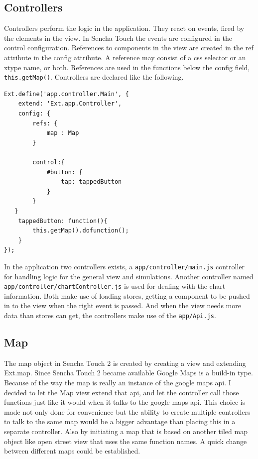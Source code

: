 \subsection{Controllers}
Controllers perform the logic in the application. They react on events, fired by the elements in the view. In Sencha Touch the events are configured in the control configuration. References to components in the view are created in the ref attribute in the config attribute. A reference may consist of a css selector or an xtype name, or both. References are used in the functions below the config field, \texttt{this.getMap()}. Controllers are declared like the following.
\begin{lstlisting}
Ext.define('app.controller.Main', {
	extend: 'Ext.app.Controller',
	config: {
		refs: {  
			map : Map      
		}
		
		control:{
			#button: {
				tap: tappedButton
			}
		}        
   }   
	tappedButton: function(){
		this.getMap().dofunction();
	}
});
\end{lstlisting}
In the application two controllers exists, a \texttt{app/controller/main.js} controller for handling logic for the general view and simulations. Another controller named \\
\texttt{app/controller/chartController.js} is used for dealing with the chart information. Both make use of loading stores, getting a component to be pushed in to the view when the right event is passed. And when the view needs more data than stores can get, the controllers make use of the \texttt{app/Api.js}. 

\subsection{Map}
The map object in Sencha Touch 2 is created by creating a view and extending Ext.map. Since Sencha Touch 2 became available Google Maps is a build-in type. Because of the way the map is really an instance of the google maps api. I decided to let the Map view extend that api, and let the controller call those functions just like it would when it talks to the google maps api. This choice is made not only done for convenience but the ability to create multiple controllers to talk to the same map would be a bigger advantage than placing this in a separate controller. Also by initiating a map that is based on another tiled map object like open street view that uses the same function names. A quick change between different maps could be established. 

